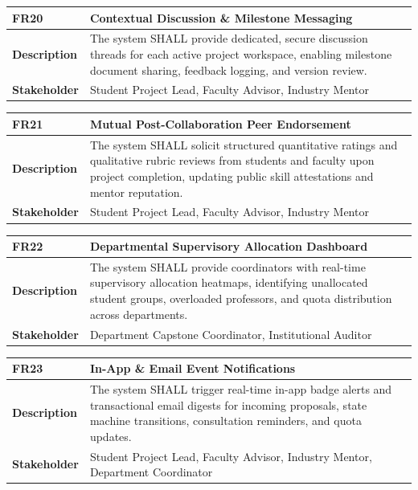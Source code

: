 \begin{table}[H]
\centering
\small
\begin{tabularx}{\textwidth}{|l|X|}
\hline
\rowcolor{lightgray!40} \textbf{FR20} & \textbf{Contextual Discussion \& Milestone Messaging} \\ \hline
\textbf{Description} & The system SHALL provide dedicated, secure discussion threads for each active project workspace, enabling milestone document sharing, feedback logging, and version review. \\ \hline
\textbf{Stakeholder} & Student Project Lead, Faculty Advisor, Industry Mentor \\ \hline
\end{tabularx}
\end{table}

\begin{table}[H]
\centering
\small
\begin{tabularx}{\textwidth}{|l|X|}
\hline
\rowcolor{lightgray!40} \textbf{FR21} & \textbf{Mutual Post-Collaboration Peer Endorsement} \\ \hline
\textbf{Description} & The system SHALL solicit structured quantitative ratings and qualitative rubric reviews from students and faculty upon project completion, updating public skill attestations and mentor reputation. \\ \hline
\textbf{Stakeholder} & Student Project Lead, Faculty Advisor, Industry Mentor \\ \hline
\end{tabularx}
\end{table}

\begin{table}[H]
\centering
\small
\begin{tabularx}{\textwidth}{|l|X|}
\hline
\rowcolor{lightgray!40} \textbf{FR22} & \textbf{Departmental Supervisory Allocation Dashboard} \\ \hline
\textbf{Description} & The system SHALL provide coordinators with real-time supervisory allocation heatmaps, identifying unallocated student groups, overloaded professors, and quota distribution across departments. \\ \hline
\textbf{Stakeholder} & Department Capstone Coordinator, Institutional Auditor \\ \hline
\end{tabularx}
\end{table}

\begin{table}[H]
\centering
\small
\begin{tabularx}{\textwidth}{|l|X|}
\hline
\rowcolor{lightgray!40} \textbf{FR23} & \textbf{In-App \& Email Event Notifications} \\ \hline
\textbf{Description} & The system SHALL trigger real-time in-app badge alerts and transactional email digests for incoming proposals, state machine transitions, consultation reminders, and quota updates. \\ \hline
\textbf{Stakeholder} & Student Project Lead, Faculty Advisor, Industry Mentor, Department Coordinator \\ \hline
\end{tabularx}
\end{table}

